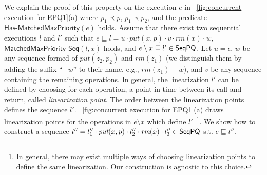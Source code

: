 \documentclass[a4paper,UKenglish]{lipics-v2016}
\begin{document}
We explain the proof of this property on the execution $e$ in \figurename~\ref{fig:concurrent execution for EPQ1}(a) where $p_1 \prec p$, $p_1 \prec p_2$, and the predicate $\mathsf{Has\text{-}MatchedMaxPriority}(e)$ holds. Assume that there exist two sequential executions $l$ and $l'$ such that $e \sqsubseteq l=u \cdot \textit{put}(x,p) \cdot v \cdot \textit{rm}(x) \cdot w$, $\mathsf{MatchedMaxPriority\text{-}Seq}(l,x)$ holds, and $e \setminus x \sqsubseteq l' \in \mathsf{SeqPQ}$. Let $u=\epsilon$, $w$ be any sequence formed of $\textit{put}(z_2,p_2)$ and $\textit{rm}(z_1)$ (we distinguish them by adding the suffix ``$-w$'' to their name, e.g., $\textit{rm}(z_1)-w$), and $v$ be any sequence containing the remaining operations. In general, the linearization $l'$ can be defined by choosing for each operation, a point in time between its call and return, called \emph{linearization point}. The order between the linearization points defines the sequence $l'$. \figurename~\ref{fig:concurrent execution for EPQ1}(a) draws linearization points for the operations in $e \setminus x$ which define $l'$~\footnote{In general, there may exist multiple ways of choosing linearization points to define the same linearization. Our construction is agnostic to this choice.}.
We show how to construct a sequence $l''= l''_1 \cdot \textit{put}(x,p) \cdot l''_2 \cdot \textit{rm}(x) \cdot l''_3\in\mathsf{SeqPQ}$ s.t. $e \sqsubseteq l''$.
\end{document}
